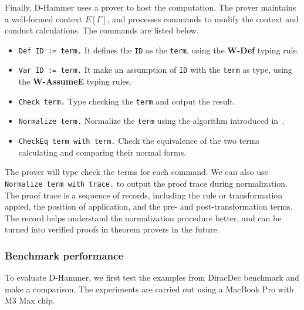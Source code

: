 Finally, D-Hammer uses a prover to host the computation. The prover maintains a well-formed context $E[\Gamma]$, and processes commands to modify the context and conduct calculations. The commands are listed below.
\begin{itemize}
    \item \texttt{\textcolor{NavyBlue}{Def} ID := term.} It defines the \texttt{ID} as the \texttt{term}, using the \textbf{W-Def} typing rule.
    \item \texttt{\textcolor{NavyBlue}{Var} ID := term.} It make an assumption of \texttt{ID} with the \texttt{term} as type, using the \textbf{W-AssumeE} typing rules.
    \item \texttt{\textcolor{NavyBlue}{Check} term.} Type checking the \texttt{term} and output the result.
    \item \texttt{\textcolor{NavyBlue}{Normalize} term.} Normalize the \texttt{term} using the algorithm introduced in~.
    \item \texttt{\textcolor{NavyBlue}{CheckEq} term \textcolor{NavyBlue}{with} term.} Check the equivalence of the two terms calculating and comparing their normal forms.
\end{itemize}
The prover will type check the terms for each command. We can also use \texttt{\textcolor{NavyBlue}{Normalize} term \textcolor{NavyBlue}{with trace}.} to output the proof trace during normalization. The proof trace is a sequence of records, including the rule or transformation appied, the position of application, and the pre- and post-transformation terms. The record helps understand the normalization procedure better, and can be turned into verified proofs in theorem provers in the future.



\subsubsection{Benchmark performance}

To evaluate D-Hammer, we first test the examples from DiracDec benchmark and make a comparison.
The experiments are carried out using a MacBook Pro with M3 Max chip.

